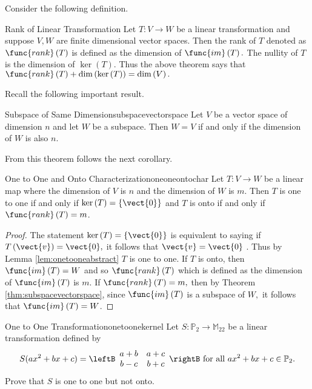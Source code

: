 Consider the following definition. 

\begin{definition}{Rank of Linear Transformation}{}
Let $T:V\rightarrow W$ be a linear transformation and suppose $V,W$ are finite dimensional vector spaces. Then
the rank of $T$ denoted as $\func{rank}\left( T\right) $ is defined as the
dimension of $\func{im}\left( T\right) .$ The nullity of $T$ is the
dimension of $\ker \left( T\right) .$ Thus the above theorem says that $
\func{rank}\left( T\right) +\dim \left( \ker \left( T\right) \right) =\dim
\left( V\right) .$
\end{definition}

Recall the following important result. 

\begin{theorem}{Subspace of Same Dimension}{subspacevectorspace}
Let $V$ be a vector space of dimension $n$ and let $W$ be a
subspace. Then $W=V$ if and only if the dimension of $W$ is also $n$.
\end{theorem}

From this theorem follows the next corollary.

\begin{corollary}{One to One and Onto Characterization}{oneoneontochar}
Let $T:V\rightarrow W$ be a linear map where the dimension of $V$ is $n$ and
the dimension of $W$ is $m$. Then $T$ is one to one if and only if $\ker
\left( T\right) =\left\{ \vect{0}\right\} $ and $T$ is onto if and only if $
\func{rank}\left( T\right) =m$.
\end{corollary}

\begin{proof}
The statement $\ker \left( T \right) =\left\{ \vect{0}\right\} $
is equivalent to saying if $T \left( \vect{v} \right)=\vect{0},$ it follows that $\vect{v}=\vect{0}$
. Thus by Lemma \ref{lem:onetooneabstract} $T$ is one to one. If $T$ is onto, then $
\func{im}\left( T\right) =W$ and so $\func{rank}\left( T\right) $ which is
defined as the dimension of $\func{im}\left( T\right) $ is $m$. If $\func{
rank}\left( T\right) =m,$ then by Theorem \ref{thm:subspacevectorspace}, since $\func{im}
\left( T\right) $ is a subspace of $W,$ it follows that $\func{im}\left(
T\right) =W$. 
\end{proof}

\begin{example}{One to One Transformation}{onetoonekernel}
Let $S:\mathbb{P}_2\to\mathbb{M}_{22}$ be a linear transformation
defined by
\[ S(ax^2+bx+c)
=
\leftB\begin{array}{cc}
a+b & a+c \\ b-c & b+c \end{array}\rightB
\mbox{ for all }
 ax^2+bx+c\in \mathbb{P}_2.\]
Prove that $S$ is one to one but not onto.
\end{example}

